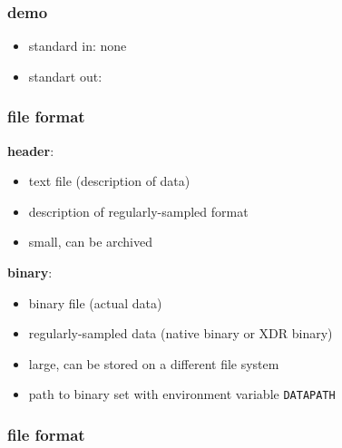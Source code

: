 \begin{frame}[fragile] \frametitle{demo}

  
  \vfill
  \begin{itemize}
  \item standard in: none
  \item standart out: 
  \end{itemize}
  
\end{frame}
\cwpnote{}

\begin{frame} \frametitle{file format}

  \textbf{header}:
  \begin{itemize}
  \item text file (description of data)
  \item description of regularly-sampled format
  \item small, can be archived
  \end{itemize}
  
  \textbf{binary}:
  \begin{itemize}
  \item binary file (actual data)
  \item regularly-sampled data (native binary or XDR binary)
  \item large, can be stored on a different file system
  \item path to binary set with environment variable \texttt{DATAPATH}
  \end{itemize}
  
\end{frame}
\cwpnote{}


\begin{frame} \frametitle{file format}
\end{frame}
\cwpnote{}

